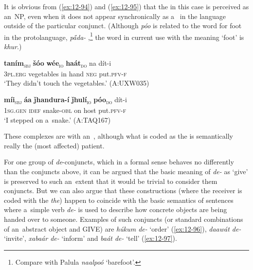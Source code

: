 \begin{exe}
It is obvious from (\ref{ex:12-94}) and (\ref{ex:12-95}) that the  in this case is
perceived as an~NP, even when it does not appear synchronically as a~ in the language outside of
the particular conjunct. (Although \textit{póo} is related to the word for foot in the protolanguage, \textit{p\'{\={a}}da-} \citep[8056]{turner1966},\footnote{Compare with Palula \textit{naalpoó} `barefoot'.} the word in current use with the meaning `foot' is
\textit{khur}.)

\begin{exe}
\ex
\label{ex:12-94}
\gll {\ob}\textbf{taním}{\cb}\textsubscript{\textsc{\upshape sbj}} {\ob}\textbf{šóo} \textbf{wée}{\cb}\textsubscript{\textsc{\upshape io}} {\ob}\textbf{haát}{\cb}\textsubscript{\textsc{\upshape do}} na dít-i\\
\textsc{3pl.erg} vegetables in hand \textsc{neg} put.\textsc{pfv-f} \\
\glt `They didn't touch the vegetables.' (A:UXW035)
\end{exe}
\begin{exe}
\ex
\label{ex:12-95}
\gll {\ob}\textbf{míi}{\cb}\textsubscript{\textsc{\upshape sbj}} {\ob}\textbf{áa} \textbf{ǰhandura-í} \textbf{ǰhulí}{\cb}\textsubscript{\textsc{\upshape io}} {\ob}\textbf{póo}{\cb}\textsubscript{\textsc{\upshape do}} dít-i\\
\textsc{1sg.gen} \textsc{idef} snake-\textsc{obl} on host put.\textsc{pfv-f}\\
\glt `I stepped on a~snake.' (A:TAQ167)
\end{exe}

These complexes are  with an~, although what is coded as the  is semantically really the (most affected) patient. 


 For one group of \textit{de}-conjuncts, which in a formal sense behaves no differently than the conjuncts above, it can be argued that the basic meaning of \textit{de-} as `give' is preserved to such an~extent that it would be trivial to consider them conjuncts. But we can also argue that these constructions (where the receiver is coded with the  \textit{the}) happen to coincide with the basic semantics of sentences where a~simple verb \textit{de-} is used to describe how concrete objects are being handed over to someone. Examples of such conjuncts (or standard combinations of an~abstract object and GIVE) are \textit{húkum de-} `order' (\ref{ex:12-96}), \textit{daawát de-} `invite', \textit{xabaár de-} `inform' and \textit{baát de-} `tell' (\ref{ex:12-97}).


\end{exe}
